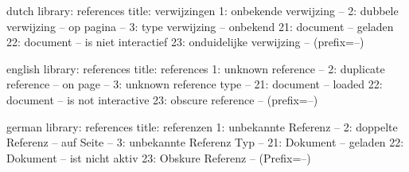 %



\unprotect

\startmessages  dutch  library: references
  title: verwijzingen
      1: onbekende verwijzing -- 
      2: dubbele verwijzing -- op pagina --
      3: type verwijzing -- onbekend
     21: document -- geladen
     22: document -- is niet interactief
     23: onduidelijke verwijzing -- (prefix=--)
\stopmessages

\startmessages  english  library: references
  title: references
      1: unknown reference --
      2: duplicate reference -- on page --
      3: unknown reference type --
     21: document -- loaded
     22: document -- is not interactive
     23: obscure reference -- (prefix=--)
\stopmessages

\startmessages  german  library: references
  title: referenzen
      1: unbekannte Referenz --
      2: doppelte Referenz -- auf Seite --
      3: unbekannte Referenz Typ --
     21: Dokument -- geladen
     22: Dokument -- ist nicht aktiv
     23: Obskure Referenz -- (Prefix=--)
\stopmessages


